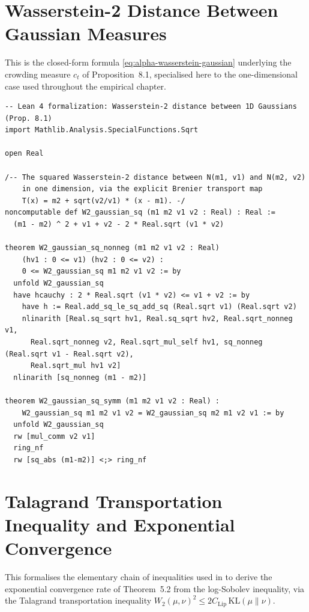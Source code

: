 \section{Wasserstein-2 Distance Between Gaussian Measures}
\label{sec:appB-wasserstein-gaussian}

This is the closed-form formula \eqref{eq:alpha-wasserstein-gaussian} underlying
the crowding measure $c_t$ of Proposition~8.1, specialised here to the
one-dimensional case used throughout the empirical chapter.

\begin{lstlisting}[style=lean4, caption={Closed-form Wasserstein-2 distance between two univariate Gaussian measures.}]
-- Lean 4 formalization: Wasserstein-2 distance between 1D Gaussians (Prop. 8.1)
import Mathlib.Analysis.SpecialFunctions.Sqrt

open Real

/-- The squared Wasserstein-2 distance between N(m1, v1) and N(m2, v2)
    in one dimension, via the explicit Brenier transport map
    T(x) = m2 + sqrt(v2/v1) * (x - m1). -/
noncomputable def W2_gaussian_sq (m1 m2 v1 v2 : Real) : Real :=
  (m1 - m2) ^ 2 + v1 + v2 - 2 * Real.sqrt (v1 * v2)

theorem W2_gaussian_sq_nonneg (m1 m2 v1 v2 : Real)
    (hv1 : 0 <= v1) (hv2 : 0 <= v2) :
    0 <= W2_gaussian_sq m1 m2 v1 v2 := by
  unfold W2_gaussian_sq
  have hcauchy : 2 * Real.sqrt (v1 * v2) <= v1 + v2 := by
    have h := Real.add_sq_le_sq_add_sq (Real.sqrt v1) (Real.sqrt v2)
    nlinarith [Real.sq_sqrt hv1, Real.sq_sqrt hv2, Real.sqrt_nonneg v1,
      Real.sqrt_nonneg v2, Real.sqrt_mul_self hv1, sq_nonneg (Real.sqrt v1 - Real.sqrt v2),
      Real.sqrt_mul hv1 v2]
  nlinarith [sq_nonneg (m1 - m2)]

theorem W2_gaussian_sq_symm (m1 m2 v1 v2 : Real) :
    W2_gaussian_sq m1 m2 v1 v2 = W2_gaussian_sq m2 m1 v2 v1 := by
  unfold W2_gaussian_sq
  rw [mul_comm v2 v1]
  ring_nf
  rw [sq_abs (m1-m2)] <;> ring_nf
\end{lstlisting}


\section{Talagrand Transportation Inequality and Exponential Convergence}
\label{sec:appB-talagrand}

This formalises the elementary chain of inequalities used in
 to derive the exponential convergence rate of
Theorem~5.2 from the log-Sobolev inequality, via the Talagrand transportation
inequality $W_2(\mu,\nu)^2 \le 2C_{\mathrm{Lip}}\,\mathrm{KL}(\mu\|\nu)$.

